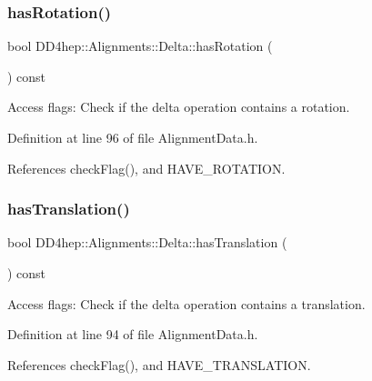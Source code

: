 \subsubsection{\texorpdfstring{has\+Rotation()}{hasRotation()}}
{\footnotesize\ttfamily bool D\+D4hep\+::\+Alignments\+::\+Delta\+::has\+Rotation (\begin{DoxyParamCaption}{ }\end{DoxyParamCaption}) const\hspace{0.3cm}{\ttfamily [inline]}}



Access flags\+: Check if the delta operation contains a rotation. 



Definition at line 96 of file Alignment\+Data.\+h.



References check\+Flag(), and H\+A\+V\+E\+\_\+\+R\+O\+T\+A\+T\+I\+ON.

\hypertarget{class_d_d4hep_1_1_alignments_1_1_delta_a6b8ab86900ceb426756f12f6a3954808}{}\label{class_d_d4hep_1_1_alignments_1_1_delta_a6b8ab86900ceb426756f12f6a3954808} 
\subsubsection{\texorpdfstring{has\+Translation()}{hasTranslation()}}
{\footnotesize\ttfamily bool D\+D4hep\+::\+Alignments\+::\+Delta\+::has\+Translation (\begin{DoxyParamCaption}{ }\end{DoxyParamCaption}) const\hspace{0.3cm}{\ttfamily [inline]}}



Access flags\+: Check if the delta operation contains a translation. 



Definition at line 94 of file Alignment\+Data.\+h.



References check\+Flag(), and H\+A\+V\+E\+\_\+\+T\+R\+A\+N\+S\+L\+A\+T\+I\+ON.

\hypertarget{class_d_d4hep_1_1_alignments_1_1_delta_afb22b2e26ceb2bb74b5fae0f2415abdd}{}\label{class_d_d4hep_1_1_alignments_1_1_delta_afb22b2e26ceb2bb74b5fae0f2415abdd} 

